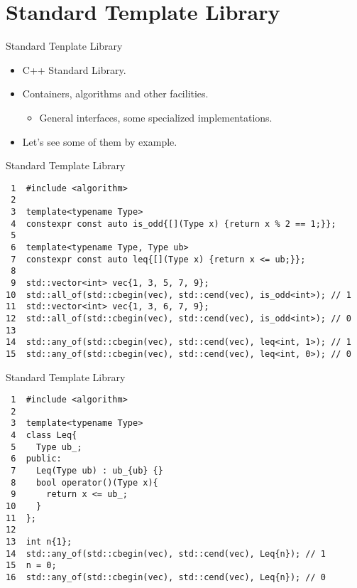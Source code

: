 \documentclass[presentation]{beamer}
\begin{document}
\section{Standard Template Library}
\label{sec:org7395937}
\begin{frame}[label={sec:org35749c9}]{Standard Tenplate Library}
\begin{itemize}
\item C++ Standard Library.
\item Containers, algorithms and other facilities.
\begin{itemize}
\item General interfaces, some specialized implementations.
\end{itemize}
\item Let's see some of them by example.
\end{itemize}
\end{frame}
\begin{frame}[label={sec:orgaacebae},fragile]{Standard Template Library}
 \begin{verbatim}
 1  #include <algorithm>
 2  
 3  template<typename Type>
 4  constexpr const auto is_odd{[](Type x) {return x % 2 == 1;}};
 5  
 6  template<typename Type, Type ub>
 7  constexpr const auto leq{[](Type x) {return x <= ub;}};
 8  
 9  std::vector<int> vec{1, 3, 5, 7, 9};
10  std::all_of(std::cbegin(vec), std::cend(vec), is_odd<int>); // 1
11  std::vector<int> vec{1, 3, 6, 7, 9};
12  std::all_of(std::cbegin(vec), std::cend(vec), is_odd<int>); // 0
13  
14  std::any_of(std::cbegin(vec), std::cend(vec), leq<int, 1>); // 1
15  std::any_of(std::cbegin(vec), std::cend(vec), leq<int, 0>); // 0
\end{verbatim}
\end{frame}
\begin{frame}[label={sec:org1641f89},fragile]{Standard Template Library}
 \begin{verbatim}
 1  #include <algorithm>
 2  
 3  template<typename Type>
 4  class Leq{
 5    Type ub_;
 6  public:
 7    Leq(Type ub) : ub_{ub} {}
 8    bool operator()(Type x){
 9      return x <= ub_;
10    }
11  };
12  
13  int n{1};
14  std::any_of(std::cbegin(vec), std::cend(vec), Leq{n}); // 1
15  n = 0;
16  std::any_of(std::cbegin(vec), std::cend(vec), Leq{n}); // 0
\end{verbatim}
\end{frame}
\end{document}

